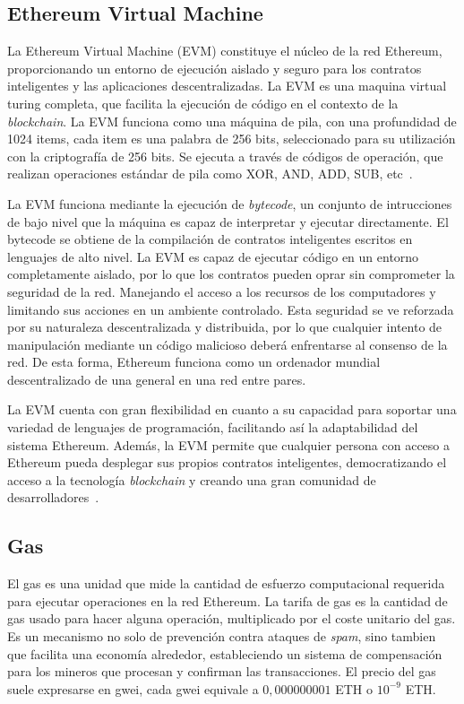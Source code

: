 \subsection{Ethereum Virtual Machine}

La Ethereum Virtual Machine (EVM) constituye el núcleo de la red Ethereum, proporcionando un entorno de ejecución aislado y seguro para los contratos inteligentes y las aplicaciones descentralizadas. 
La EVM es una maquina virtual turing completa, que facilita la ejecución de código en el contexto de la \textit{blockchain}.
La EVM funciona como una máquina de pila, con una profundidad de 1024 items, cada item es una palabra de 256 bits, seleccionado para su utilización con la criptografía de 256 bits.
Se ejecuta a través de códigos de operación, que realizan operaciones estándar de pila como XOR, AND, ADD, SUB, etc~\cite{QueEsEVM}.

La EVM funciona mediante la ejecución de \textit{bytecode}, un conjunto de intrucciones de bajo nivel que la máquina es capaz de interpretar y ejecutar directamente.
El bytecode se obtiene de la compilación de contratos inteligentes escritos en lenguajes de alto nivel. 
La EVM es capaz de ejecutar código en un entorno completamente aislado, por lo que los contratos pueden oprar sin comprometer la seguridad de la red. Manejando el acceso a los recursos de los computadores y limitando sus acciones en un ambiente controlado.
Esta seguridad se ve reforzada por su naturaleza descentralizada y distribuida, por lo que cualquier intento de manipulación mediante un código malicioso deberá enfrentarse al consenso de la red.
De esta forma, Ethereum funciona como un ordenador mundial descentralizado de una general en una red entre pares.

La EVM cuenta con gran flexibilidad en cuanto a su capacidad para soportar una variedad de lenguajes de programación, facilitando así la adaptabilidad del sistema Ethereum.
Además, la EVM permite que cualquier persona con acceso a Ethereum pueda desplegar sus propios contratos inteligentes, democratizando el acceso a la tecnología \textit{blockchain} y creando una gran comunidad de desarrolladores~\cite{ComoFuncionaEVM}.


\subsection{Gas}

El gas es una unidad que mide la cantidad de esfuerzo computacional requerida para ejecutar operaciones en la red Ethereum.
La tarifa de gas es la cantidad de gas usado para hacer alguna operación, multiplicado por el coste unitario del gas.
Es un mecanismo no solo de prevención contra ataques de \textit{spam}, sino tambien que facilita una economía alrededor, estableciendo un sistema de compensación para los mineros que procesan y confirman las transacciones.
El precio del gas suele expresarse en gwei, cada gwei equivale a \(0,000000001\) ETH o \(10^{-9}\) ETH.

